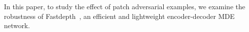 \documentclass[10pt,twocolumn,letterpaper]{article}
\begin{document}
In this paper, to study the effect of patch adversarial examples, 
we examine the robustness of Fastdepth~\cite{Wofk_2019_ICRA}, an
efficient and lightweight encoder-decoder MDE network.
\end{document}
